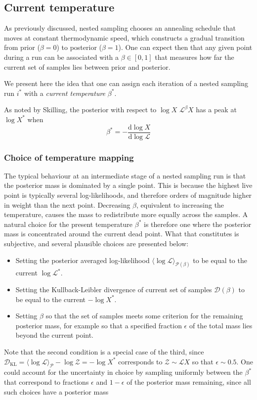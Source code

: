 \documentclass[usenatbib]{mnras}
\newcommand{\Like}{\mathcal{L}}
\newcommand{\DKL}{\mathcal{D}_\mathrm{KL}}
\begin{document}
\subsection{Current temperature}\label{sec:current_temperature}
As previously discussed, nested sampling chooses an annealing schedule that moves at constant thermodynamic speed, which constructs a gradual transition from prior ($\beta = 0$) to posterior ($\beta = 1$). One can expect then that any given point during a run can be associated with a $\beta \in [0,1]$ that measures how far the current set of samples lies between prior and posterior. 
\par
We present here the idea that one can assign each iteration of a nested sampling run $i^{*}$ with a \textit{current temperature} $\beta^*$.
\par
As noted by Skilling, the posterior with respect to $\log X$ $\Like^{\beta} X$ has a peak at $\log X^*$ when  
\begin{equation}
    \beta^* = - \frac{\mathrm{d} \log X}{\mathrm{d} \log \Like}
\end{equation}

\subsubsection*{Choice of temperature mapping}
The typical behaviour at an intermediate stage of a nested sampling run is that the posterior mass is dominated by a single point. This is because the highest live point is typically several log-likelihoods, and therefore orders of magnitude higher in weight than the next point. Decreasing $\beta$, equivalent to increasing the temperature, causes the mass to redistribute more equally across the samples. A natural choice for the present temperature $\beta^{*}$ is therefore one where the posterior mass is concentrated around the current dead point. What that constitutes is subjective, and several plausible choices are presented below:
\begin{itemize}
    \item Setting the posterior averaged log-likelihood $\langle \log\Like \rangle_{\mathcal{P}(\beta)}$ to be equal to the current $\log\Like^{*}$.
    \item Setting the Kullback-Leibler divergence of current set of samples $\mathcal{D}(\beta)$ to be equal to the current $-\log X^{*}$.
    \item Setting $\beta$ so that the set of samples meets some criterion for the remaining posterior mass, for example so that a specified fraction $\epsilon$ of the total mass lies beyond the current point.
\end{itemize}
Note that the second condition is a special case of the third, since $\DKL = \langle \log\Like \rangle_\mathcal{P} - \log \mathcal{Z} = -\log X^{*}$ corresponds to $\mathcal{Z} \sim \mathcal{L}X$ so that $\epsilon \sim 0.5$. One could account for the uncertainty in choice by sampling uniformly between the $\beta^{*}$ that correspond to fractions $\epsilon$ and $1 - \epsilon$ of the posterior mass remaining, since all such choices have a posterior mass 
\par
\end{document}
